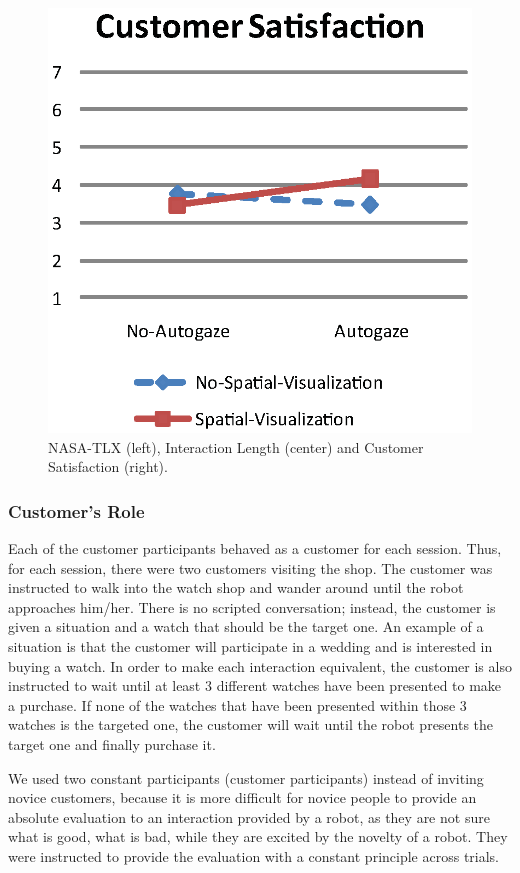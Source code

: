 \documentclass[journal]{IEEEtran}
\begin{document}
\begin{figure}[t]
\includegraphics[keepaspectratio, scale= 0.5]{figs/customerSatisfactionFinal2.eps}
\caption{NASA-TLX (left), Interaction Length (center) and Customer Satisfaction (right).}
\label{fig:results}
\end{figure}

\subsubsection{Customer's Role}
Each of the customer participants behaved as a customer for each session.
Thus, for each session, there were two customers visiting the shop. 
The customer was instructed to walk into the watch shop and wander around until the robot approaches him/her.
There is no scripted conversation; instead, the customer is given a situation and a watch that should be the target one.
An example of a situation is that the customer will participate in a wedding and is interested in buying a watch.
In order to make each interaction equivalent, the customer is also instructed to wait until at least 3 different watches have been presented to make a purchase.
If none of the watches that have been presented within those 3 watches is the targeted one, the customer will wait until the robot presents the target one and finally purchase it.

We used two constant participants (customer participants) instead of inviting novice customers, because it is more difficult for novice people to provide an absolute evaluation to an interaction provided by a robot, as they are not sure what is good, what is bad, while they are excited by the novelty of a robot.
They were instructed to provide the evaluation with a constant principle across trials. 
\end{document}
